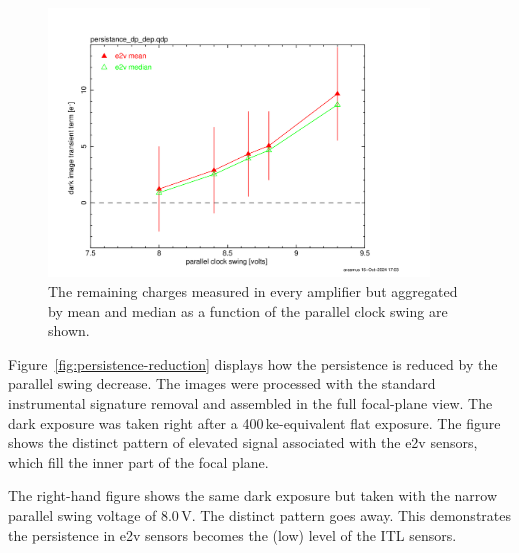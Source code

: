 \begin{figure}[ht]
\begin{centering}
\includegraphics[width=0.9\textwidth]{figures/e2v_transient_dark_vs_dp.png}

\caption{The remaining charges measured in every amplifier but
aggregated by mean and median as a function of the parallel clock swing
are shown.}
\label{fig:peristence-swing}
\end{centering}
\end{figure}

Figure~\ref{fig:persistence-reduction} displays how the persistence is reduced by the
parallel swing decrease. The images were processed with the standard instrumental
signature removal and assembled in the full focal-plane view. The
dark exposure was taken right after a 400\,ke-equivalent flat exposure.
The figure shows the distinct pattern of elevated signal associated with
the e2v sensors, which fill the inner part of the focal plane.

The right-hand figure shows the same dark exposure but taken with the narrow
parallel swing voltage of 8.0\,V. The distinct pattern goes away. This
demonstrates the persistence in e2v sensors becomes the (low) level of the 
ITL sensors.


